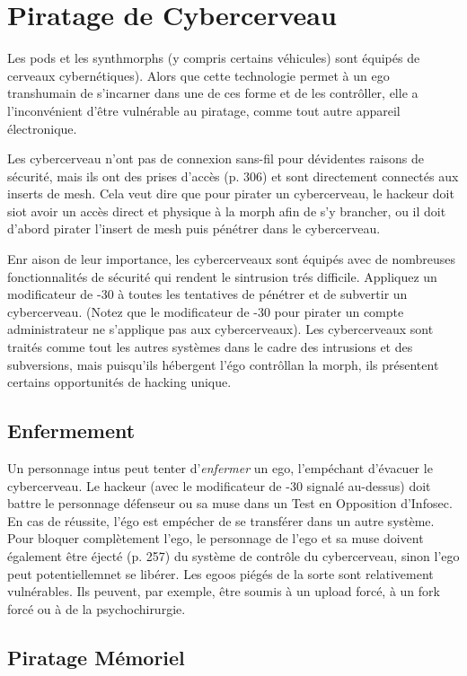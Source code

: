\section{Piratage de Cybercerveau} 

Les pods et les synthmorphs (y compris certains véhicules) sont équipés de cerveaux cybernétiques). Alors que cette technologie permet à un ego transhumain de s'incarner dans une de ces forme et de les contrôller, elle a l'inconvénient d'être vulnérable au piratage, comme tout autre appareil électronique. 

Les cybercerveau n'ont pas de connexion sans-fil pour dévidentes raisons de sécurité, mais ils ont des prises d'accès (p. 306) et sont directement connectés aux inserts de mesh. Cela veut dire que pour pirater un cybercerveau, le hackeur doit siot avoir un accès direct et physique à la morph afin de s'y brancher, ou il doit d'abord pirater l'insert de mesh puis pénétrer dans le cybercerveau. 

Enr aison de leur importance, les cybercerveaux sont équipés avec de nombreuses fonctionnalités de sécurité qui rendent le sintrusion trés difficile. Appliquez un modificateur de -30 à toutes les tentatives de pénétrer et de subvertir un cybercerveau. (Notez que le modificateur de -30 pour pirater un compte administrateur ne s'applique pas aux cybercerveaux). Les cybercerveaux sont traités comme tout les autres systèmes dans le cadre des intrusions et des subversions, mais puisqu'ils hébergent l'égo contrôllan la morph, ils présentent certains opportunités de hacking unique. 

\subsection{Enfermement} 

Un personnage intus peut tenter d'\textit{enfermer} un ego, l'empéchant d'évacuer le cybercerveau. Le hackeur (avec le modificateur de -30 signalé au-dessus) doit battre le personnage défenseur ou sa muse dans un Test en Opposition d'Infosec. En cas de réussite, l'égo est empécher de se transférer dans un autre système. Pour bloquer complètement l'ego, le personnage de l'ego et sa muse doivent également être éjecté (p. 257) du système de contrôle du cybercerveau, sinon l'ego peut potentiellemnet se libérer. Les egoos piégés de la sorte sont relativement vulnérables. Ils peuvent, par exemple, être soumis à un upload forcé, à un fork forcé ou à de la psychochirurgie. 

\subsection{Piratage Mémoriel} 

